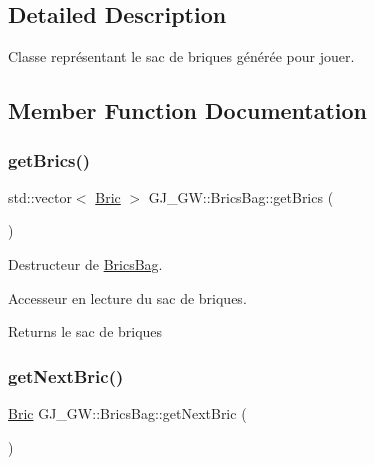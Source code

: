 \subsection{Detailed Description}
Classe représentant le sac de briques générée pour jouer. 

\subsection{Member Function Documentation}
\hypertarget{class_g_j___g_w_1_1_brics_bag_aace245eacf3ee57e2969b82409cd377a}{}\label{class_g_j___g_w_1_1_brics_bag_aace245eacf3ee57e2969b82409cd377a} 
\subsubsection{\texorpdfstring{get\+Brics()}{getBrics()}}
{\footnotesize\ttfamily std\+::vector$<$ \hyperlink{class_g_j___g_w_1_1_bric}{Bric} $>$ G\+J\+\_\+\+G\+W\+::\+Brics\+Bag\+::get\+Brics (\begin{DoxyParamCaption}{ }\end{DoxyParamCaption})\hspace{0.3cm}{\ttfamily [inline]}}



Destructeur de \hyperlink{class_g_j___g_w_1_1_brics_bag}{Brics\+Bag}. 

Accesseur en lecture du sac de briques.

\begin{DoxyReturn}{Returns}
le sac de briques 
\end{DoxyReturn}
\hypertarget{class_g_j___g_w_1_1_brics_bag_a0b7de0635ac188c140fc94b7a7632ca8}{}\label{class_g_j___g_w_1_1_brics_bag_a0b7de0635ac188c140fc94b7a7632ca8} 
\subsubsection{\texorpdfstring{get\+Next\+Bric()}{getNextBric()}}
{\footnotesize\ttfamily \hyperlink{class_g_j___g_w_1_1_bric}{Bric} G\+J\+\_\+\+G\+W\+::\+Brics\+Bag\+::get\+Next\+Bric (\begin{DoxyParamCaption}{ }\end{DoxyParamCaption})\hspace{0.3cm}{\ttfamily [inline]}}



